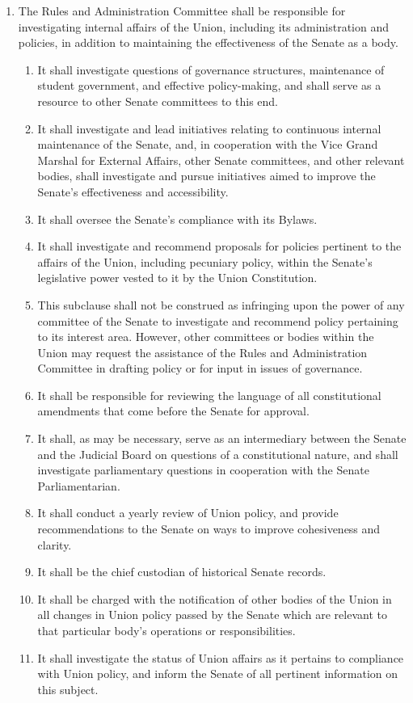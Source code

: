 \begin{enumerate}
\item The Rules and Administration Committee shall be responsible for investigating internal affairs of the Union, including its administration and policies, in addition to maintaining the effectiveness of the Senate as a body.
  \begin{enumerate}
  \item It shall investigate questions of governance structures, maintenance of student government, and effective policy-making, and shall serve as a resource to other Senate committees to this end.
  \item It shall investigate and lead initiatives relating to continuous internal maintenance of the Senate, and, in cooperation with the Vice Grand Marshal for External Affairs, other Senate committees, and other relevant bodies, shall investigate and pursue initiatives aimed to improve the Senate’s effectiveness and accessibility.
  \item It shall oversee the Senate’s compliance with its Bylaws.
  \item It shall investigate and recommend proposals for policies pertinent to the affairs of the Union, including pecuniary policy, within the Senate’s legislative power vested to it by the Union Constitution.
  \item This subclause shall not be construed as infringing upon the power of any committee of the Senate to investigate and recommend policy pertaining to its interest area. However, other committees or bodies within the Union may request the assistance of the Rules and Administration Committee in drafting policy or for input in issues of governance.
  \item It shall be responsible for reviewing the language of all constitutional amendments that come before the Senate for approval.
  \item It shall, as may be necessary, serve as an intermediary between the Senate and the Judicial Board on questions of a constitutional nature, and shall investigate parliamentary questions in cooperation with the Senate Parliamentarian.
  \item It shall conduct a yearly review of Union policy, and provide recommendations to the Senate on ways to improve cohesiveness and clarity.
  \item It shall be the chief custodian of historical Senate records.
  \item It shall be charged with the notification of other bodies of the Union in all changes in Union policy passed by the Senate which are relevant to that particular body’s operations or responsibilities.
  \item It shall investigate the status of Union affairs as it pertains to compliance with Union policy, and inform the Senate of all pertinent information on this subject.
  \end{enumerate}
\end{enumerate}

